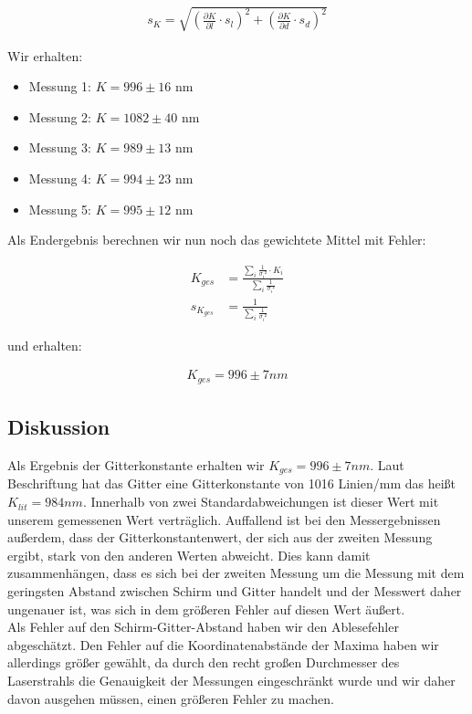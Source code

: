 \documentclass[12pt]{article}
\newcommand{\del}[2][]{\frac{\partial #1}{\partial #2}}
\begin{document}
\begin{align*}
s_K = \sqrt{\left(\del[K]{l}\cdot s_{l}\right)^2+\left(\del[K]{d}\cdot s_{d}\right)^2}
\end{align*}

Wir erhalten:

\begin{itemize}
\item Messung 1: $K = 996 \pm 16$ nm
\item Messung 2: $K = 1082 \pm 40$ nm
\item Messung 3: $K = 989 \pm 13$ nm
\item Messung 4: $K = 994 \pm 23$ nm
\item Messung 5: $K = 995 \pm 12$ nm
\end{itemize}

Als Endergebnis berechnen wir nun noch das gewichtete Mittel mit Fehler:

\begin{align*}
K_{ges} &=\frac{\sum\limits_i \frac{1}{\sigma_i²} \cdot K_i}{\sum\limits_i \frac{1}{\sigma_i²}}\\
s_{K_{ges}} &= \frac{1}{\sum\limits_i \frac{1}{\sigma_i²}}
\end{align*}

und erhalten:

\begin{align*}
K_{ges} = 996 \pm 7 nm
\end{align*}

\newpage
\subsection{Diskussion}

Als Ergebnis der Gitterkonstante erhalten wir $K_{ges} = 996 \pm 7 nm$. Laut Beschriftung hat das Gitter eine Gitterkonstante von 1016 Linien/mm das heißt $K_{lit} = 984 nm$. Innerhalb von zwei Standardabweichungen ist dieser Wert mit unserem gemessenen Wert verträglich. Auffallend ist bei den Messergebnissen außerdem, dass der Gitterkonstantenwert, der sich aus der zweiten Messung ergibt, stark von den anderen Werten abweicht. Dies kann damit zusammenhängen, dass es sich bei der zweiten Messung um die Messung mit dem geringsten Abstand zwischen Schirm und Gitter handelt und der Messwert daher ungenauer ist, was sich in dem größeren Fehler auf diesen Wert äußert. \\

Als Fehler auf den Schirm-Gitter-Abstand haben wir den Ablesefehler abgeschätzt. Den Fehler auf die Koordinatenabstände der Maxima haben wir allerdings größer gewählt, da durch den recht großen Durchmesser des Laserstrahls die Genauigkeit der Messungen eingeschränkt wurde und wir daher davon ausgehen müssen, einen größeren Fehler zu machen.
\end{document}
